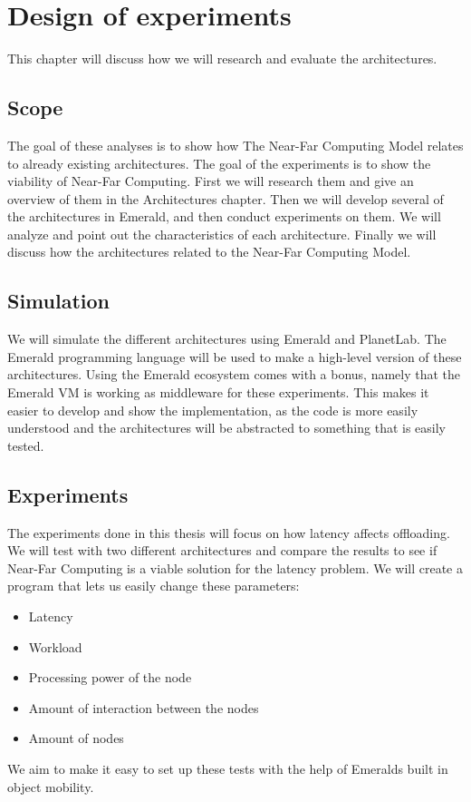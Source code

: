 \chapter{Design of experiments}\label{chapter:design_of_experiments}

This chapter will discuss how we will research and evaluate the architectures.


\section{Scope}
The goal of these analyses is to show how The Near-Far Computing Model relates to already existing architectures. The goal of the experiments is to show the viability of Near-Far Computing. First we will research them and give an overview of them in the Architectures chapter. Then we will develop several of the architectures in Emerald, and then conduct experiments on them. We will analyze and point out the characteristics of each architecture. Finally we will discuss how the architectures related to the Near-Far Computing Model.




\section{Simulation}
We will simulate the different architectures using Emerald and PlanetLab. The Emerald programming language will be used to make a high-level version of these architectures. Using the Emerald ecosystem comes with a bonus, namely that the Emerald VM is working as middleware for these experiments. This makes it easier to develop and show the implementation, as the code is more easily understood and the architectures will be abstracted to something that is easily tested.








\section{Experiments}
The experiments done in this thesis will focus on how latency affects offloading. We will test with two different architectures and compare the results to see if Near-Far Computing is a viable solution for the latency problem. We will create a program that lets us easily change these parameters:
\begin{itemize}
    \item Latency
    \item Workload
    \item Processing power of the node
    \item Amount of interaction between the nodes
    \item Amount of nodes
\end{itemize}
We aim to make it easy to set up these tests with the help of Emeralds built in object mobility. 

